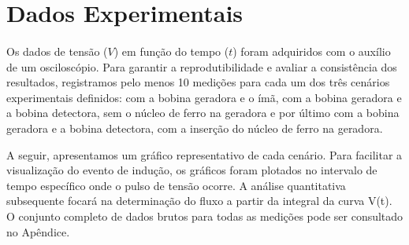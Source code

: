 \documentclass[column,brazilian,12pt,a4paper,final]{article}
\begin{document}
\section{Dados Experimentais}
\paragraph{}
Os dados de tensão ($V$) em função do tempo ($t$) foram adquiridos com o auxílio de um osciloscópio. Para garantir a reprodutibilidade e avaliar a consistência dos resultados, registramos pelo menos 10 medições para cada um dos três cenários experimentais definidos: com a bobina geradora e o ímã, com a bobina geradora e a bobina detectora, sem o núcleo de ferro na geradora e por último com a bobina geradora e a bobina detectora, com a inserção do núcleo de ferro na geradora.

A seguir, apresentamos um gráfico representativo de cada cenário. Para facilitar a visualização do evento de indução, os gráficos foram plotados no intervalo de tempo específico onde o pulso de tensão ocorre. A análise quantitativa subsequente focará na determinação do fluxo a partir da integral da curva V(t). O conjunto completo de dados brutos para todas as medições pode ser consultado no Apêndice.
\end{document}
